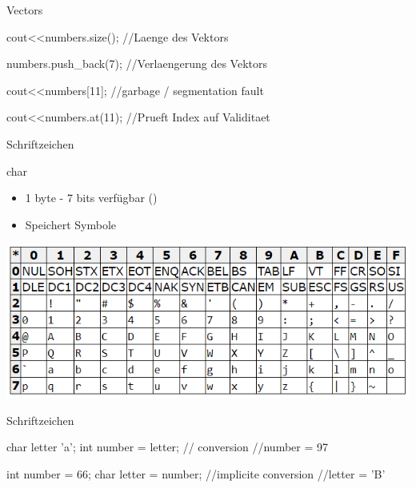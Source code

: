 \ifnum\conditionmacro=1 \documentclass[handout,usenames,dvipsnames]{beamer}\fi
\begin{document}
\begin{frame}[fragile]{Vectors}
\begin{TFCpp}
cout<<numbers.size(); //Laenge des Vektors

numbers.push_back(7); //Verlaengerung des Vektors

cout<<numbers[11]; //garbage / segmentation fault

cout<<numbers.at(11); //Prueft Index auf Validitaet


\end{TFCpp}

\end{frame}

\begin{frame}[fragile]{Schriftzeichen}
\begin{block}{char}
\begin{itemize}
\item 1 byte - 7 bits verfügbar ()
\item Speichert Symbole
\end{itemize}
\end{block}

\includegraphics[width=\linewidth]{ASCII}

\end{frame}

\begin{frame}[fragile]{Schriftzeichen}
\begin{TPCpp}
char letter 'a';
int number = letter; // conversion
//number = 97

int number = 66;
char letter = number; //implicite conversion
//letter = 'B'
\end{TPCpp}
\end{frame}

\end{document}
